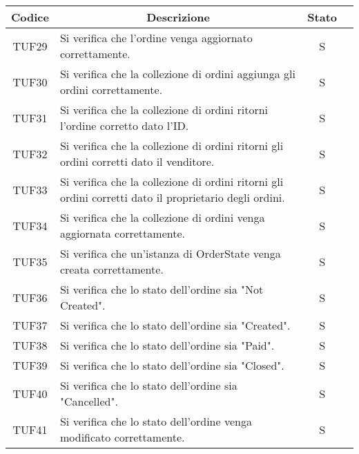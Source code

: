 \begin{table}[H]
  \centering
  \renewcommand{\arraystretch}{1.8}
  \begin{tabular}{c|p{8cm}|c|c}
    \rowcolor[HTML]{125E28}
    \color[HTML]{FFFFFF}\textbf{Codice}
          & \multicolumn{1}{c}{\color[HTML]{FFFFFF}\textbf{Descrizione}}
          & \color[HTML]{FFFFFF}\textbf{Stato}                                                                         \\
    \hline
    TUF29 & Si verifica che l'ordine venga aggiornato correttamente.                                               & S \\
    TUF30 & Si verifica che la collezione di ordini aggiunga gli ordini correttamente.                             & S \\
    TUF31 & Si verifica che la collezione di ordini ritorni l'ordine corretto dato l'ID.                           & S \\
    TUF32 & Si verifica che la collezione di ordini ritorni gli ordini corretti dato il venditore.                 & S \\
    TUF33 & Si verifica che la collezione di ordini ritorni gli ordini corretti dato il proprietario degli ordini. & S \\
    TUF34 & Si verifica che la collezione di ordini venga aggiornata correttamente.                                & S \\
    TUF35 & Si verifica che un'istanza di OrderState venga creata correttamente.                                   & S \\
    TUF36 & Si verifica che lo stato dell'ordine sia "Not Created".                                                & S \\
    TUF37 & Si verifica che lo stato dell'ordine sia "Created".                                                    & S \\
    TUF38 & Si verifica che lo stato dell'ordine sia "Paid".                                                       & S \\
    TUF39 & Si verifica che lo stato dell'ordine sia "Closed".                                                     & S \\
    TUF40 & Si verifica che lo stato dell'ordine sia "Cancelled".                                                  & S \\
    TUF41 & Si verifica che lo stato dell'ordine venga modificato correttamente.                                   & S \\

\end{tabular}
\end{table}
